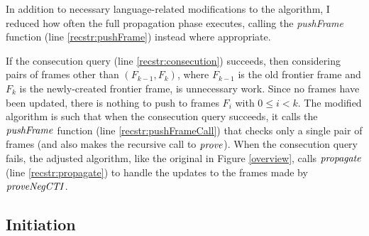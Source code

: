 \documentclass[12pt,a4paper,twoside,openright]{report}
\begin{document}
{{In addition to necessary language-related modifications to the algorithm, I 
reduced how often the full propagation phase executes, calling the {\it pushFrame}
function (line \ref{recstr:pushFrame}) instead where appropriate.


If the consecution query (line \ref{recstr:consecution}) succeeds, then
considering pairs of frames other
than $(F_{k - 1}, F_k)$, where $F_{k - 1}$ is the old frontier frame and $F_k$ is
the newly-created frontier frame, is unnecessary work.
Since no frames have been updated, there is nothing to push to frames $F_i$ with
$0 \leq i < k$.
The modified algorithm is such
that when the consecution query succeeds, it calls the ${\it pushFrame}$ function
(line \ref{recstr:pushFrameCall}) that
checks only a single pair of frames (and also makes the recursive call to ${\it prove}$).
When the consecution query fails, the adjusted algorithm, like the original in Figure \ref{overview},
calls ${\it propagate}$ (line \ref{recstr:propagate})
to handle the updates to the frames made by ${\it proveNegCTI}$.


\subsection{Initiation}

}}
\end{document}
